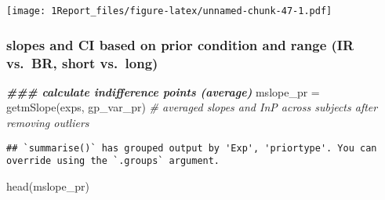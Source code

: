 \documentclass[
]{article}
\newenvironment{Shaded}{\begin{snugshade}}{\end{snugshade}}
\newcommand{\CommentTok}[1]{\textcolor[rgb]{0.56,0.35,0.01}{\textit{#1}}}
\newcommand{\DecValTok}[1]{\textcolor[rgb]{0.00,0.00,0.81}{#1}}
\newcommand{\DocumentationTok}[1]{\textcolor[rgb]{0.56,0.35,0.01}{\textbf{\textit{#1}}}}
\newcommand{\FunctionTok}[1]{\textcolor[rgb]{0.00,0.00,0.00}{#1}}
\newcommand{\NormalTok}[1]{#1}
\newcommand{\OtherTok}[1]{\textcolor[rgb]{0.56,0.35,0.01}{#1}}
\newcommand{\SpecialCharTok}[1]{\textcolor[rgb]{0.00,0.00,0.00}{#1}}
\newcommand{\StringTok}[1]{\textcolor[rgb]{0.31,0.60,0.02}{#1}}
\begin{document}
\texttt{[image: 1Report\_files/figure-latex/unnamed-chunk-47-1.pdf]}

\hypertarget{slopes-and-ci-based-on-prior-condition-and-range-ir-vs.-br-short-vs.-long}{%
\subsubsection{slopes and CI based on prior condition and range (IR
vs.~BR, short
vs.~long)}\label{slopes-and-ci-based-on-prior-condition-and-range-ir-vs.-br-short-vs.-long}}

\begin{Shaded}
\end{Shaded}

\begin{Shaded}
\begin{Highlighting}[]
\DocumentationTok{\#\#\# calculate indifference points (average)}
\NormalTok{mslope\_pr }\OtherTok{=} \FunctionTok{getmSlope}\NormalTok{(exps, gp\_var\_pr)  }\CommentTok{\# averaged slopes and InP across subjects after removing outliers}
\end{Highlighting}
\end{Shaded}

\begin{verbatim}
## `summarise()` has grouped output by 'Exp', 'priortype'. You can override using the `.groups` argument.
\end{verbatim}

\begin{Shaded}
\begin{Highlighting}[]
\FunctionTok{head}\NormalTok{(mslope\_pr)}
\end{Highlighting}
\end{Shaded}
\end{document}
